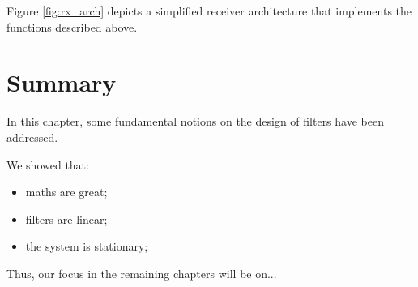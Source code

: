 Figure \ref{fig:rx_arch} depicts a simplified receiver architecture that implements the functions described above. 

\section{Summary} 
\label{sec:summary_comm_eng}
In this chapter, some fundamental notions on the design of filters have been addressed.

We showed that: 
\begin{itemize}
	\item maths are great;
	\item filters are linear;
	\item the system is stationary;
\end{itemize}

Thus, our focus in the remaining chapters will be on...

